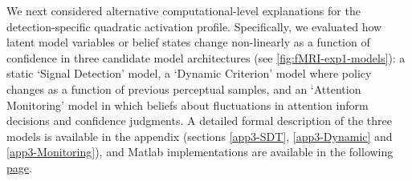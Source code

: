 \documentclass[12pt,twoside]{reedthesis}
\begin{document}
We next considered alternative computational-level explanations for the detection-specific quadratic activation profile. Specifically, we evaluated how latent model variables or belief states change non-linearly as a function of confidence in three candidate model architectures (see \ref{fig:fMRI-exp1-models}): a static `Signal Detection' model, a `Dynamic Criterion' model where policy changes as a function of previous perceptual samples, and an `Attention Monitoring' model in which beliefs about fluctuations in attention inform decisions and confidence judgments. A detailed formal description of the three models is available in the appendix (sections \ref{app3-SDT}, \ref{app3-Dynamic} and \ref{app3-Monitoring}), and Matlab implementations are available in the following \href{https://github.com/matanmazor/detectionVsDiscrimination_fMRI/blob/master/simulation/simulations.mlx}{page}.
\end{document}
